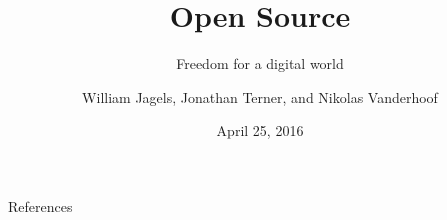 \documentclass{beamer}
\title{Open Source}
\subtitle{Freedom for a digital world}
\author{William Jagels, Jonathan Terner, and Nikolas Vanderhoof}
\institute{Binghamton University}
\date{April 25, 2016}
\begin{document}
\frame{\titlepage}









\begin{frame}[allowframebreaks]{References}
  
  
\end{frame}
\end{document}
